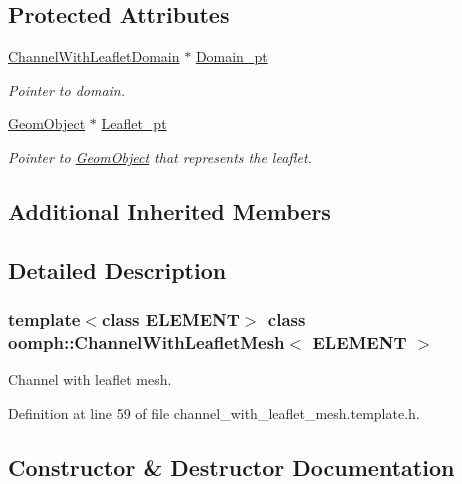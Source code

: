 \subsection*{Protected Attributes}
\begin{DoxyCompactItemize}
\item 
\hyperlink{classoomph_1_1ChannelWithLeafletDomain}{Channel\+With\+Leaflet\+Domain} $\ast$ \hyperlink{classoomph_1_1ChannelWithLeafletMesh_a20dc25dbf38222156f72b6d6213c5246}{Domain\+\_\+pt}
\begin{DoxyCompactList}\small\item\em Pointer to domain. \end{DoxyCompactList}\item 
\hyperlink{classoomph_1_1GeomObject}{Geom\+Object} $\ast$ \hyperlink{classoomph_1_1ChannelWithLeafletMesh_ab0d744f2c35b9397dd35cc75a2db9e60}{Leaflet\+\_\+pt}
\begin{DoxyCompactList}\small\item\em Pointer to \hyperlink{classoomph_1_1GeomObject}{Geom\+Object} that represents the leaflet. \end{DoxyCompactList}\end{DoxyCompactItemize}
\subsection*{Additional Inherited Members}


\subsection{Detailed Description}
\subsubsection*{template$<$class E\+L\+E\+M\+E\+NT$>$\newline
class oomph\+::\+Channel\+With\+Leaflet\+Mesh$<$ E\+L\+E\+M\+E\+N\+T $>$}

Channel with leaflet mesh. 

Definition at line 59 of file channel\+\_\+with\+\_\+leaflet\+\_\+mesh.\+template.\+h.



\subsection{Constructor \& Destructor Documentation}
\mbox{\label{classoomph_1_1ChannelWithLeafletMesh_ab210be34e9d7f72af9aefee618d41f3d}} 
